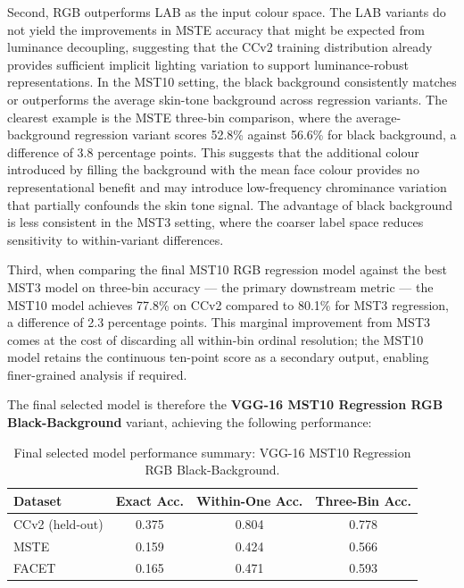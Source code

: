 Second, RGB outperforms LAB as the input colour space. The LAB variants do not yield the improvements in MSTE accuracy that might be expected from luminance decoupling, suggesting that the CCv2 training distribution already provides sufficient implicit lighting variation to support luminance-robust representations. In the MST10 setting, the black background consistently matches or outperforms the average skin-tone background across regression variants. The clearest example is the MSTE three-bin comparison, where the average-background regression variant scores 52.8\% against 56.6\% for black background, a difference of 3.8 percentage points. This suggests that the additional colour introduced by filling the background with the mean face colour provides no representational benefit and may introduce low-frequency chrominance variation that partially confounds the skin tone signal. The advantage of black background is less consistent in the MST3 setting, where the coarser label space reduces sensitivity to within-variant differences.

Third, when comparing the final MST10 RGB regression model against the best MST3 model on three-bin accuracy --- the primary downstream metric --- the MST10 model achieves 77.8\% on CCv2 compared to 80.1\% for MST3 regression, a difference of 2.3 percentage points. This marginal improvement from MST3 comes at the cost of discarding all within-bin ordinal resolution; the MST10 model retains the continuous ten-point score as a secondary output, enabling finer-grained analysis if required.

The final selected model is therefore the \textbf{VGG-16 MST10 Regression RGB Black-Background} variant, achieving the following performance:

\begin{table}[htbp]
	\centering
	\caption{Final selected model performance summary: VGG-16 MST10 Regression RGB Black-Background.}
	\label{tab:vgg16_final}
	\begin{tabular}{lccc}
		\toprule
		\textbf{Dataset} & \textbf{Exact Acc.} & \textbf{Within-One Acc.} & \textbf{Three-Bin Acc.} \\
		\midrule
		CCv2 (held-out) & 0.375 & 0.804 & 0.778 \\
		MSTE            & 0.159 & 0.424 & 0.566 \\
		FACET           & 0.165 & 0.471 & 0.593 \\
		\bottomrule
	\end{tabular}
\end{table}

